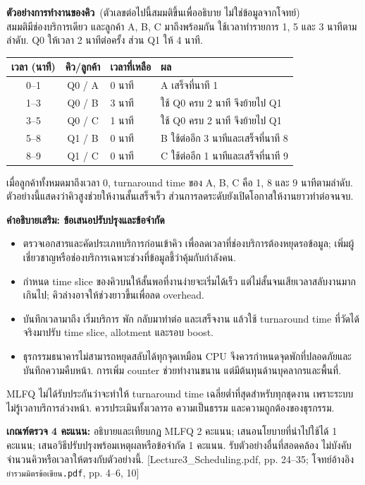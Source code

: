 \noindent\textbf{ตัวอย่างการทำงานของคิว}\ (ตัวเลขต่อไปนี้สมมติขึ้นเพื่ออธิบาย ไม่ใช่ข้อมูลจากโจทย์)\\
สมมติมีช่องบริการเดียว และลูกค้า A, B, C มาถึงพร้อมกัน ใช้เวลาทำรายการ 1, 5 และ 3 นาทีตามลำดับ. Q0 ให้เวลา 2 นาทีต่อครั้ง ส่วน Q1 ให้ 4 นาที.
\begin{center}\renewcommand{\arraystretch}{1.2}\begin{tabular}{c|c|l|l}
เวลา (นาที) & คิว/ลูกค้า & เวลาที่เหลือ & ผล\\\hline
0--1 & Q0 / A & 0 นาที & A เสร็จที่นาที 1\\
1--3 & Q0 / B & 3 นาที & ใช้ Q0 ครบ 2 นาที จึงย้ายไป Q1\\
3--5 & Q0 / C & 1 นาที & ใช้ Q0 ครบ 2 นาที จึงย้ายไป Q1\\
5--8 & Q1 / B & 0 นาที & B ใช้ต่ออีก 3 นาทีและเสร็จที่นาที 8\\
8--9 & Q1 / C & 0 นาที & C ใช้ต่ออีก 1 นาทีและเสร็จที่นาที 9\\
\end{tabular}\end{center}
\noindent เมื่อลูกค้าทั้งหมดมาถึงเวลา 0, turnaround time ของ A, B, C คือ 1, 8 และ 9 นาทีตามลำดับ. ตัวอย่างนี้แสดงว่าคิวสูงช่วยให้งานสั้นเสร็จเร็ว ส่วนการลดระดับยังเปิดโอกาสให้งานยาวทำต่อจนจบ.\par\medskip
\newpage\noindent\textbf{คำอธิบายเสริม: ข้อเสนอปรับปรุงและข้อจำกัด}
\begin{itemize}[leftmargin=1.4em,itemsep=.15cm]
\item ตรวจเอกสารและคัดประเภทบริการก่อนเข้าคิว เพื่อลดเวลาที่ช่องบริการต้องหยุดรอข้อมูล; เพิ่มผู้เชี่ยวชาญหรือช่องบริการเฉพาะช่วงที่ข้อมูลชี้ว่าคุ้มกับกำลังคน.
\item กำหนด time slice ของคิวบนให้สั้นพอที่งานง่ายจะเริ่มได้เร็ว แต่ไม่สั้นจนเสียเวลาสลับงานมากเกินไป; คิวล่างอาจให้ช่วงยาวขึ้นเพื่อลด overhead.
\item บันทึกเวลามาถึง เริ่มบริการ พัก กลับมาทำต่อ และเสร็จงาน แล้วใช้ turnaround time ที่วัดได้จริงมาปรับ time slice, allotment และรอบ boost.
\item ธุรกรรมธนาคารไม่สามารถหยุดสลับได้ทุกจุดเหมือน CPU จึงควรกำหนดจุดพักที่ปลอดภัยและบันทึกความคืบหน้า. การเพิ่ม counter ช่วยทำงานขนาน แต่มีต้นทุนด้านบุคลากรและพื้นที่.
\end{itemize}
\noindent MLFQ ไม่ได้รับประกันว่าจะทำให้ turnaround time เฉลี่ยต่ำที่สุดสำหรับทุกชุดงาน เพราะระบบไม่รู้เวลาบริการล่วงหน้า. ควรประเมินทั้งเวลารอ ความเป็นธรรม และความถูกต้องของธุรกรรม.\par\medskip
\noindent\textbf{เกณฑ์ตรวจ 4 คะแนน:} อธิบายและเทียบกฎ MLFQ 2 คะแนน; เสนอนโยบายที่นำไปใช้ได้ 1 คะแนน; เสนอวิธีปรับปรุงพร้อมเหตุผลหรือข้อจำกัด 1 คะแนน. รับตัวอย่างอื่นที่สอดคล้อง ไม่บังคับจำนวนคิวหรือเวลาให้ตรงกับตัวอย่างนี้. {\small [Lecture3\_Scheduling.pdf, pp. 24--35; โจทย์อ้างอิง \texttt{ยำรวมมิตรข้อเขียน.pdf}, pp. 4--6, 10]}
